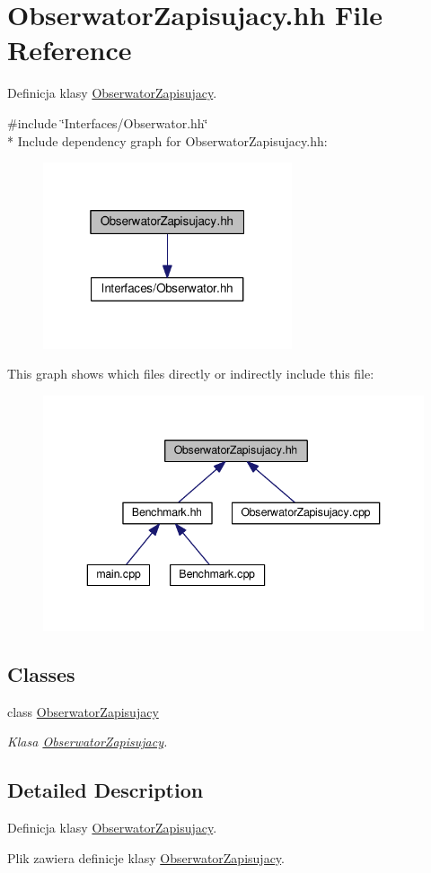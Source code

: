 \hypertarget{a00046}{}\section{Obserwator\+Zapisujacy.\+hh File Reference}
\label{a00046}


Definicja klasy \hyperlink{a00014}{Obserwator\+Zapisujacy}.  


{\ttfamily \#include \char`\"{}Interfaces/\+Obserwator.\+hh\char`\"{}}\\*
Include dependency graph for Obserwator\+Zapisujacy.\+hh\+:
\nopagebreak
\begin{figure}[H]
\begin{center}
\leavevmode
\includegraphics[width=208pt]{a00093}
\end{center}
\end{figure}
This graph shows which files directly or indirectly include this file\+:
\nopagebreak
\begin{figure}[H]
\begin{center}
\leavevmode
\includegraphics[width=343pt]{a00094}
\end{center}
\end{figure}
\subsection*{Classes}
\begin{DoxyCompactItemize}
\item 
class \hyperlink{a00014}{Obserwator\+Zapisujacy}
\begin{DoxyCompactList}\small\item\em Klasa \hyperlink{a00014}{Obserwator\+Zapisujacy}. \end{DoxyCompactList}\end{DoxyCompactItemize}


\subsection{Detailed Description}
Definicja klasy \hyperlink{a00014}{Obserwator\+Zapisujacy}. 

Plik zawiera definicje klasy \hyperlink{a00014}{Obserwator\+Zapisujacy}. 